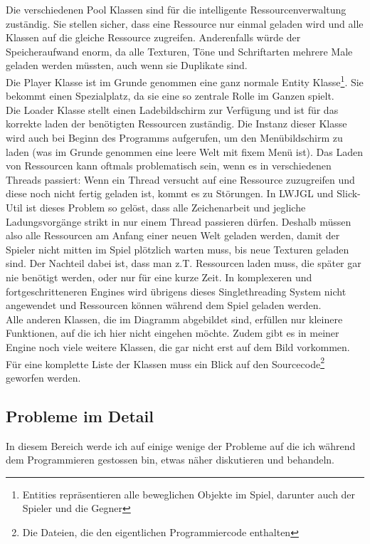 \documentclass[12pt,a4paper,titlepage]{article}
\begin{document}
		Die verschiedenen Pool Klassen sind für die intelligente Ressourcenverwaltung zuständig. Sie stellen sicher, dass eine Ressource nur einmal geladen wird und alle Klassen auf die gleiche Ressource zugreifen. Anderenfalls würde der Speicheraufwand enorm, da alle Texturen, Töne und Schriftarten mehrere Male geladen werden müssten, auch wenn sie Duplikate sind.\\
		
		Die Player Klasse ist im Grunde genommen eine ganz normale Entity Klasse\footnote{Entities repräsentieren alle beweglichen Objekte im Spiel, darunter auch der Spieler und die Gegner}. Sie bekommt einen Spezialplatz, da sie eine so zentrale Rolle im Ganzen spielt.\\
		
		Die Loader Klasse stellt einen Ladebildschirm zur Verfügung und ist für das korrekte laden der benötigten Ressourcen zuständig. Die Instanz dieser Klasse wird auch bei Beginn des Programms aufgerufen, um den Menübildschirm zu laden (was im Grunde genommen eine leere Welt mit fixem Menü ist). Das Laden von Ressourcen kann oftmals problematisch sein, wenn es in verschiedenen Threads passiert: Wenn ein Thread versucht auf eine Ressource zuzugreifen und diese noch nicht fertig geladen ist, kommt es zu Störungen. In LWJGL und Slick-Util ist dieses Problem so gelöst, dass alle Zeichenarbeit und jegliche Ladungsvorgänge strikt in nur einem Thread passieren dürfen. Deshalb müssen also alle Ressourcen am Anfang einer neuen Welt geladen werden, damit der Spieler nicht mitten im Spiel plötzlich warten muss, bis neue Texturen geladen sind. Der Nachteil dabei ist, dass man z.T. Ressourcen laden muss, die später gar nie benötigt werden, oder nur für eine kurze Zeit. In komplexeren und fortgeschritteneren Engines wird übrigens dieses Singlethreading System nicht angewendet und Ressourcen können während dem Spiel geladen werden.\\
		
		Alle anderen Klassen, die im Diagramm abgebildet sind, erfüllen nur kleinere Funktionen, auf die ich hier nicht eingehen möchte. Zudem gibt es in meiner Engine noch viele weitere Klassen, die gar nicht erst auf dem Bild vorkommen. Für eine komplette Liste der Klassen muss ein Blick auf den Sourcecode\footnote{Die Dateien, die den eigentlichen Programmiercode enthalten} geworfen werden.
		
	\subsection{Probleme im Detail}
		In diesem Bereich werde ich auf einige wenige der Probleme auf die ich während dem Programmieren gestossen bin, etwas näher diskutieren und behandeln.
		
\end{document}
